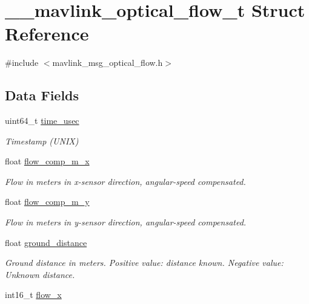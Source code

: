 \hypertarget{struct____mavlink__optical__flow__t}{\section{\+\_\+\+\_\+mavlink\+\_\+optical\+\_\+flow\+\_\+t Struct Reference}
\label{struct____mavlink__optical__flow__t}
}


{\ttfamily \#include $<$mavlink\+\_\+msg\+\_\+optical\+\_\+flow.\+h$>$}

\subsection*{Data Fields}
\begin{DoxyCompactItemize}
\item 
uint64\+\_\+t \hyperlink{struct____mavlink__optical__flow__t_a01f76c236ab67155fe7770f82eb86ad6}{time\+\_\+usec}
\begin{DoxyCompactList}\small\item\em Timestamp (U\+N\+I\+X) \end{DoxyCompactList}\item 
float \hyperlink{struct____mavlink__optical__flow__t_ab8fab603e276328627e4d96cc4f8b086}{flow\+\_\+comp\+\_\+m\+\_\+x}
\begin{DoxyCompactList}\small\item\em Flow in meters in x-\/sensor direction, angular-\/speed compensated. \end{DoxyCompactList}\item 
float \hyperlink{struct____mavlink__optical__flow__t_a2e39bcd7b74a5c660d1684c8e44e2cca}{flow\+\_\+comp\+\_\+m\+\_\+y}
\begin{DoxyCompactList}\small\item\em Flow in meters in y-\/sensor direction, angular-\/speed compensated. \end{DoxyCompactList}\item 
float \hyperlink{struct____mavlink__optical__flow__t_a89b39010e211494ffecc65c29fdd8c0e}{ground\+\_\+distance}
\begin{DoxyCompactList}\small\item\em Ground distance in meters. Positive value\+: distance known. Negative value\+: Unknown distance. \end{DoxyCompactList}\item 
int16\+\_\+t \hyperlink{struct____mavlink__optical__flow__t_a1e1332d4eb9a84f38d32af8f32ed8c10}{flow\+\_\+x}

\end{DoxyCompactItemize}
